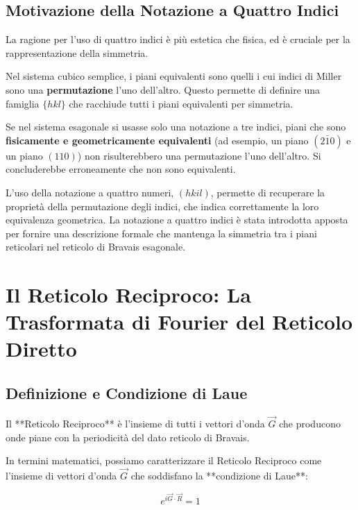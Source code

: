 \subsection{Motivazione della Notazione a Quattro Indici}
La ragione per l'uso di quattro indici è più estetica che fisica, ed è cruciale per la rappresentazione della simmetria.

Nel sistema cubico semplice, i piani equivalenti sono quelli i cui indici di Miller sono una \textbf{permutazione} l'uno dell'altro. Questo permette di definire una famiglia $\{hkl\}$ che racchiude tutti i piani equivalenti per simmetria.

Se nel sistema esagonale si usasse solo una notazione a tre indici, piani che sono \textbf{fisicamente e geometricamente equivalenti} (ad esempio, un piano $(2\bar{1}0)$ e un piano $(110)$) non risulterebbero una permutazione l'uno dell'altro. Si concluderebbe erroneamente che non sono equivalenti.

L'uso della notazione a quattro numeri, $(h k i l)$, permette di recuperare la proprietà della permutazione degli indici, che indica correttamente la loro equivalenza geometrica. La notazione a quattro indici è stata introdotta apposta per fornire una descrizione formale che mantenga la simmetria tra i piani reticolari nel reticolo di Bravais esagonale.

\section{Il Reticolo Reciproco: La Trasformata di Fourier del Reticolo Diretto}

\subsection{Definizione e Condizione di Laue}

Il **Reticolo Reciproco** è l'insieme di tutti i vettori d'onda $\vec{G}$ che producono onde piane con la periodicità del dato reticolo di Bravais.

In termini matematici, possiamo caratterizzare il Reticolo Reciproco come l'insieme di vettori d'onda $\vec{G}$ che soddisfano la **condizione di Laue**:

\vspace{1em}
\begin{equation}
e^{i \vec{G} \cdot \vec{R}} = 1
\end{equation}
\vspace{1em}

